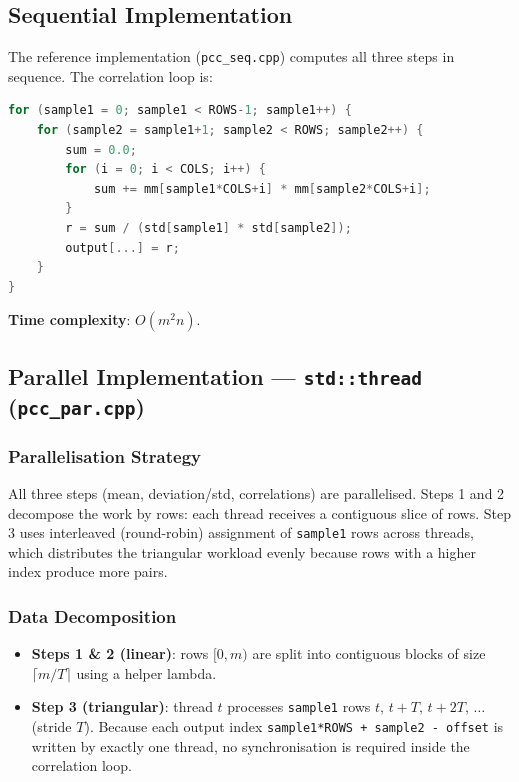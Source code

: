 \documentclass[11pt,a4paper]{article}
\begin{document}
\subsection{Sequential Implementation}

The reference implementation (\texttt{pcc\_seq.cpp}) computes all three steps in sequence. The
correlation loop is:

\begin{lstlisting}[language=C++, caption=Sequential PCC correlation loop]
for (sample1 = 0; sample1 < ROWS-1; sample1++) {
    for (sample2 = sample1+1; sample2 < ROWS; sample2++) {
        sum = 0.0;
        for (i = 0; i < COLS; i++) {
            sum += mm[sample1*COLS+i] * mm[sample2*COLS+i];
        }
        r = sum / (std[sample1] * std[sample2]);
        output[...] = r;
    }
}
\end{lstlisting}

\textbf{Time complexity}: $O(m^2 n)$.

\subsection{Parallel Implementation --- \texttt{std::thread} (\texttt{pcc\_par.cpp})}

\subsubsection{Parallelisation Strategy}

All three steps (mean, deviation/std, correlations) are parallelised. Steps 1 and 2 decompose
the work by rows: each thread receives a contiguous slice of rows. Step 3 uses interleaved
(round-robin) assignment of \texttt{sample1} rows across threads, which distributes the
triangular workload evenly because rows with a higher index produce more pairs.

\subsubsection{Data Decomposition}

\begin{itemize}
    \item \textbf{Steps 1 \& 2 (linear)}: rows $[0, m)$ are split into contiguous blocks of
          size $\lceil m/T \rceil$ using a helper lambda.
    \item \textbf{Step 3 (triangular)}: thread $t$ processes \texttt{sample1} rows
          $t,\, t+T,\, t+2T,\,\ldots$ (stride $T$). Because each output index
          \texttt{sample1*ROWS + sample2 - offset} is written by exactly one thread, no
          synchronisation is required inside the correlation loop.
\end{itemize}
\end{document}
